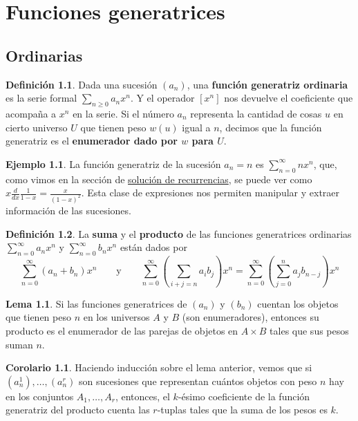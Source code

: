 \documentclass[spanish]{book}
\theoremstyle{definition}
\newtheorem*{defn}{Definición}
\newtheorem*{lema}{Lema}
\newtheorem*{coro}{Corolario}
\newtheorem*{ejem}{Ejemplo}
\begin{document}
\chapter{Funciones generatrices}
\section{Ordinarias}
\begin{defn}
	Dada una sucesión $(a_n)$, una \textbf{función generatriz ordinaria} es la serie formal $\sum_{n\geq0}a_nx^n$. Y el operador $[x^n]$ nos devuelve el coeficiente que acompaña a $x^n$ en la serie. Si el número $a_n$ representa la cantidad de cosas $u$ en cierto universo $U$ que tienen peso $w(u)$ igual a $n$, decimos que la función generatriz es el \textbf{enumerador dado por $w$ para $U$}.
\end{defn}
\begin{ejem}
	La función generatriz de la sucesión $a_n=n$ es $\sum_{n=0}^\infty nx^n$, que, como vimos en la sección de \hyperref[sec:res-rec-fg]{solución de recurrencias}, se puede ver como $x\frac{d}{dx}\frac{1}{1-x}=\frac{x}{(1-x)^2}$. Esta clase de expresiones nos permiten manipular y extraer información de las sucesiones.
\end{ejem}
\begin{defn}
	La \textbf{suma} y el \textbf{producto} de las funciones generatrices ordinarias $\sum_{n=0}^\infty a_nx^n$ y $\sum_{n=0}^\infty b_nx^n$ están dados por 
	\[\sum_{n=0}^\infty (a_n+b_n)x^n\qquad\text{y}\qquad\sum_{n=0}^\infty \left(\sum_{i+j=n}a_ib_j\right)x^n=\sum_{n=0}^\infty \left(\sum_{j=0}^na_jb_{n-j}\right)x^n\]
\end{defn}
\begin{lema}
	Si las funciones generatrices de $(a_n)$ y $(b_n)$ cuentan los objetos que tienen peso $n$ en los universos $A$ y $B$ (son enumeradores),
	entonces su producto es el enumerador de las parejas de objetos en $A\times B$ tales que sus pesos suman $n$.
\end{lema}
\begin{coro}
	Haciendo inducción sobre el lema anterior, vemos que si $(a^1_n),\ldots,(a^r_n)$ son sucesiones que representan cuántos objetos con peso $n$ hay en los conjuntos $A_1,\ldots,A_r$, entonces, el $k$-ésimo coeficiente de la función generatriz del producto cuenta las $r$-tuplas tales que la suma de los pesos es $k$.
\end{coro}
\end{document}
